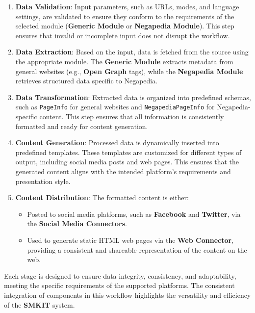 \begin{enumerate}
    \item \textbf{Data Validation}: Input parameters, such as URLs, modes, and language settings, are validated to ensure they conform to the requirements of the selected module (\textbf{Generic Module} or \textbf{Negapedia Module}). This step ensures that invalid or incomplete input does not disrupt the workflow.
    \item \textbf{Data Extraction}: Based on the input, data is fetched from the source using the appropriate module. The \textbf{Generic Module} extracts metadata from general websites (e.g., \textbf{Open Graph} tags), while the \textbf{Negapedia Module} retrieves structured data specific to Negapedia.
    \item \textbf{Data Transformation}: Extracted data is organized into predefined schemas, such as \texttt{PageInfo} for general websites and \texttt{NegapediaPageInfo} for Negapedia-specific content. This step ensures that all information is consistently formatted and ready for content generation.
    \item \textbf{Content Generation}: Processed data is dynamically inserted into predefined templates. These templates are customized for different types of output, including social media posts and web pages. This ensures that the generated content aligns with the intended platform's requirements and presentation style.
    \item \textbf{Content Distribution}: The formatted content is either:
    \begin{itemize}
        \item Posted to social media platforms, such as \textbf{Facebook} and \textbf{Twitter}, via the \textbf{Social Media Connectors}.
        \item Used to generate static HTML web pages via the \textbf{Web Connector}, providing a consistent and shareable representation of the content on the web.
    \end{itemize}
\end{enumerate}

Each stage is designed to ensure data integrity, consistency, and adaptability, meeting the specific requirements of the supported platforms. The consistent integration of components in this workflow highlights the versatility and efficiency of the \textbf{SMKIT} system.

